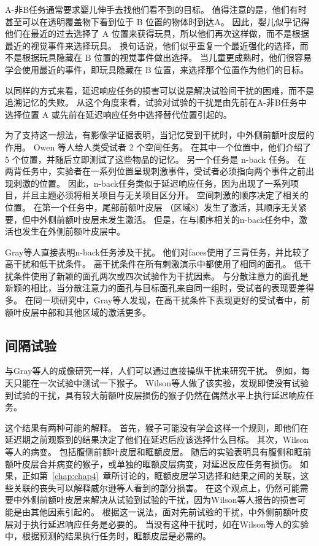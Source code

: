 A-非B任务通常要求婴儿伸手去找他们看不到的目标。
值得注意的是，他们有时甚至可以在透明覆盖物下看到位于 B 位置的物体时到达A\cite{butterworth1977object}。
因此，婴儿似乎记得他们在最近的过去选择了 A 位置来获得玩具，所以他们再次这样做，而不是根据最近的视觉事件来选择玩具。
换句话说，他们似乎重复一个最近强化的选择，而不是根据玩具隐藏在 B 位置的视觉事件做出选择。
当儿童更成熟时，他们很容易学会使用最近的事件，即玩具隐藏在 B 位置，来选择那个位置作为他们的目标。


以同样的方式来看，延迟响应任务的损害可以说是解决试验间干扰的困难，而不是追溯记忆的失败。
从这个角度来看，试验对试验的干扰是由先前在A-非B任务中选择位置 A 或先前在延迟响应任务中选择替代位置引起的。


为了支持这一想法，有影像学证据表明，当记忆受到干扰时，中外侧前额叶皮层的作用。
Owen 等人\cite{owen1999redefining}给人类受试者 2 个空间任务。
在其中一个位置中，他们介绍了 5 个位置，并随后立即测试了这些物品的记忆。
另一个任务是 n-back 任务。
在两背任务中，实验者在一系列位置呈现刺激事件，受试者必须指向两个事件之前出现刺激的位置。
因此，n-back任务类似于延迟响应任务，因为出现了一系列项目，并且主题必须将相关项目与无关项目区分开。
空间刺激的顺序决定了相关的位置。
在第一个任务中，尾部前额叶皮层 （区域8）发生了激活，其顺序无关紧要，但中外侧前额叶皮层未发生激活。
但是，在与顺序相关的n-back任务中，激活也发生在外侧前额叶皮层中。


Gray等人\cite{gray2003neural}直接表明n-back任务涉及干扰。
他们对faces使用了三背任务，并比较了高干扰和低干扰条件。
高干扰条件在所有刺激演示中都使用了相同的面孔。
低干扰条件使用了新颖的面孔两次或四次试验作为干扰因素。
与分散注意力的面孔是新颖的相比，当分散注意力的面孔与目标面孔来自同一组时，受试者的表现要差得多。
在同一项研究中，Gray等人发现，在高干扰条件下表现更好的受试者中，前额叶皮层中部和其他区域的激活更多。



\subsection{间隔试验}

与Gray等人\cite{gray2003neural}的成像研究一样，人们可以通过直接操纵干扰来研究干扰。
例如，每天只能在一次试验中测试一下猴子。
Wilson等人\cite{wilson1963effect}做了该实验，发现即使没有试验到试验的干扰，具有较大前额叶皮层损伤的猴子仍然在偶然水平上执行延迟响应任务。


这个结果有两种可能的解释。
首先，猴子可能没有学会这样一个规则，即他们在延迟期之前观察到的结果决定了他们在延迟后应该选择什么目标。
其次，Wilson等人的病变。
包括腹侧前额叶皮层和眶额皮层。
随后的实验表明具有腹侧和眶前额叶皮层合并病变的猴子\cite{passingham1971behavioural}，或单独的眶额皮层病变\cite{meunier1997effects}，对延迟反应任务有损伤。
如果，正如第~\ref{chap:chap4}~章所讨论的，眶额皮层学习选择和结果之间的关联，这些关联的丧失可以解释威尔逊等人看到的部分损害。
在这个观点上，仍然可能需要中外侧前额叶皮层来解决从试验到试验的干扰，因为Wilson等人报告的损害可能是由其他因素引起的。
根据这一说法，面对先前试验的干扰，中外侧前额叶皮层对于执行延迟响应任务是必要的。
当没有这种干扰时，如在Wilson等人的实验中，根据预测的结果执行任务时，眶额皮层是必需的。



